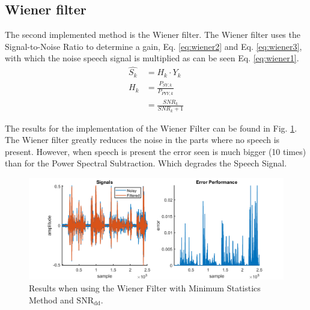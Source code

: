 \subsection{Wiener filter}
The second implemented method is the Wiener filter. The Wiener filter uses the Signal-to-Noise Ratio to determine a gain, Eq. \ref{eq:wiener2} and Eq. \ref{eq:wiener3}, with which the noise speech signal is multiplied as can be seen Eq. \ref{eq:wiener1}.
\begin{align}
  \hat{S_{k}} &= H_{k} \cdot Y_{k}
  \label{eq:wiener1} \\
  H_{k} &= \frac{P_{SY,k}}{P_{PYY,k}}
  \label{eq:wiener2} \\
  &= \frac{SNR_{k}}{SNR_{k}+1}
  \label{eq:wiener3}
\end{align}

The results for the implementation of the Wiener Filter can be found in Fig. \ref{fig:Wiener}. The Wiener filter greatly reduces the noise in the parts where no speech is present. However, when speech is present the error seen is much bigger (10 times) than for the Power Spectral Subtraction. Which degrades the Speech Signal.
\begin{figure}[h]
	\centering
	\includegraphics[width=\textwidth]{images/wiener.png}
	\caption{Results when using the Wiener Filter with Minimum Statistics Method and $\text{SNR}_{\text{dd}}$.}
	\label{fig:Wiener}
\end{figure}
